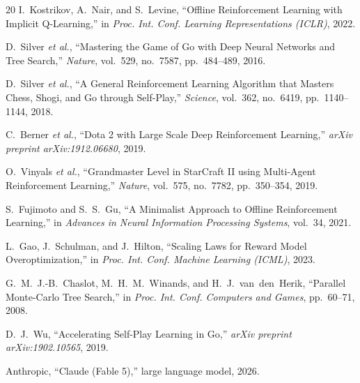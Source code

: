 \documentclass[journal]{IEEEtran}
\begin{document}
\begin{thebibliography}{20}
I.~Kostrikov, A.~Nair, and S.~Levine, ``Offline Reinforcement Learning with Implicit Q-Learning,'' in \textit{Proc. Int. Conf. Learning Representations (ICLR)}, 2022.

D.~Silver \textit{et al.}, ``Mastering the Game of Go with Deep Neural Networks and Tree Search,'' \textit{Nature}, vol.~529, no.~7587, pp.~484--489, 2016.

D.~Silver \textit{et al.}, ``A General Reinforcement Learning Algorithm that Masters Chess, Shogi, and Go through Self-Play,'' \textit{Science}, vol.~362, no.~6419, pp.~1140--1144, 2018.

C.~Berner \textit{et al.}, ``Dota 2 with Large Scale Deep Reinforcement Learning,'' \textit{arXiv preprint arXiv:1912.06680}, 2019.

O.~Vinyals \textit{et al.}, ``Grandmaster Level in StarCraft II using Multi-Agent Reinforcement Learning,'' \textit{Nature}, vol.~575, no.~7782, pp.~350--354, 2019.

S.~Fujimoto and S.~S.~Gu, ``A Minimalist Approach to Offline Reinforcement Learning,'' in \textit{Advances in Neural Information Processing Systems}, vol.~34, 2021.

L.~Gao, J.~Schulman, and J.~Hilton, ``Scaling Laws for Reward Model Overoptimization,'' in \textit{Proc. Int. Conf. Machine Learning (ICML)}, 2023.

G.~M.~J.-B.~Chaslot, M.~H.~M.~Winands, and H.~J.~van~den~Herik, ``Parallel Monte-Carlo Tree Search,'' in \textit{Proc. Int. Conf. Computers and Games}, pp.~60--71, 2008.

D.~J.~Wu, ``Accelerating Self-Play Learning in Go,'' \textit{arXiv preprint arXiv:1902.10565}, 2019.

Anthropic, ``Claude (Fable 5),'' large language model, 2026.


\end{thebibliography}
\end{document}
